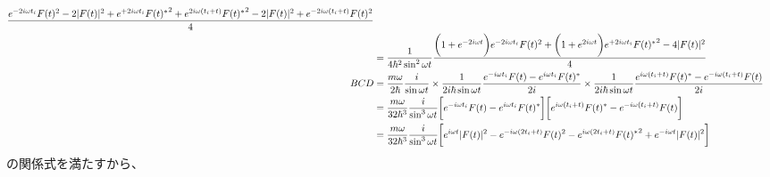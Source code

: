 \begin{subequations}
\begin{align}
    \dfrac{
            e^{- 2 i \omega t_i} F(t)^2
        -
            2 | F(t) |^2
        +
            e^{+ 2 i \omega t_i} {F(t)^*}^2
    +
            e^{2 i \omega (t_i + t)} {F(t)^*}^2
        -
            2 | F(t) |^2
        +
            e^{- 2 i \omega (t_i + t)} F(t)^2
    }{4}
\notag\\&
    =
    \dfrac{1}{4 \hbar^2 \sin^2 \omega t}
    \dfrac{
        \bigg(
            1
        +
            e^{- 2 i \omega t}
        \bigg) 
        e^{- 2 i \omega t_i}
        F(t)^2
    +
        \bigg(
            1
        +
            e^{2 i \omega t}
        \bigg) 
        e^{+ 2 i \omega t_i} {F(t)^*}^2
    -
        4 | F(t) |^2
    }{4}
\\
    BCD
    &=
    \dfrac{m \omega}{2 \hbar}
    \dfrac{ i }{\sin \omega t}
\times
    \dfrac{1}{2 i \hbar \sin \omega t}
    \dfrac{
        e^{- i \omega t_i} F(t)
    -
        e^{i \omega t_i} F(t)^*
    }{2 i}
\times
    \dfrac{1}{2 i \hbar \sin \omega t}
    \dfrac{
        e^{i \omega (t_i + t)} F(t)^*
    -
        e^{- i \omega (t_i + t)} F(t)
    }{2 i}
\notag\\&
    =
    \dfrac{m \omega}{32 \hbar^3}
    \dfrac{ i }{\sin^3 \omega t}
    \bigg[
        e^{- i \omega t_i} F(t)
    -
        e^{i \omega t_i} F(t)^*
    \bigg]
    \bigg[
        e^{i \omega (t_i + t)} F(t)^*
    -
        e^{- i \omega (t_i + t)} F(t)
    \bigg]
\notag\\&
    =
    \dfrac{m \omega}{32 \hbar^3}
    \dfrac{ i }{\sin^3 \omega t}
    \bigg[
        e^{i \omega t}
        | F(t) |^2
    -
        e^{- i \omega (2 t_i + t)} F(t)^2
    -
        e^{i \omega (2 t_i + t)} {F(t)^*}^2
    +
        e^{- i \omega t}
        | F(t) |^2
    \bigg]
\end{align}
\end{subequations}
の関係式を満たすから、
